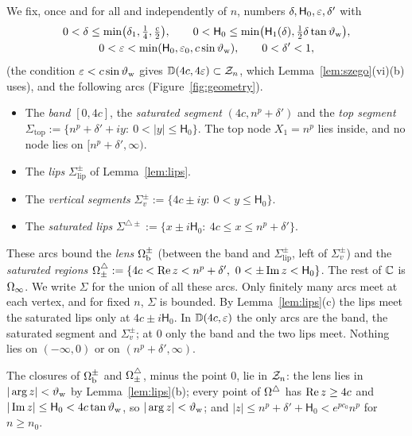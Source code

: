 We fix, once and for all and independently of $n$, numbers $\delta,\mathsf H_0,\varepsilon,\delta'$ with
\begin{gather*}
  0<\delta\le\min\bigl(\delta_1,\tfrac14,\tfrac c2\bigr),\qquad 0<\mathsf H_0\le\min\bigl(\mathsf H_1(\delta),\tfrac12\delta\tan\vartheta_{\mathrm{w}}\bigr),\\
  0<\varepsilon<\min(\mathsf H_0,\varepsilon_0,c\sin\vartheta_{\mathrm{w}}),\qquad 0<\delta'<1,
\end{gather*}
(the condition $\varepsilon<c\sin\vartheta_{\mathrm{w}}$ gives $\mathbb D(4c,4\varepsilon)\subset\mathcal{Z}_n$, which Lemma~\ref{lem:szego}(vi)(b) uses), and the
following arcs (Figure~\ref{fig:geometry}).
\begin{itemize}
\item The \emph{band} $[0,4c]$, the \emph{saturated segment} $(4c,n^p+\delta')$ and the \emph{top segment}
  $\Sigma_{\mathrm{top}}:=\{n^p+\delta'+iy:\ 0<|y|\le \mathsf H_0\}$. The top node $X_1=n^p$ lies inside, and no node lies on
  $[n^p+\delta',\infty)$.
\item The \emph{lips} $\Sigma_{\mathrm{lip}}^\pm$ of Lemma~\ref{lem:lips}.
\item The \emph{vertical segments} $\Sigma_v^\pm:=\{4c\pm iy:\ 0<y\le \mathsf H_0\}$.
\item The \emph{saturated lips} $\Sigma^{\triangle\pm}:=\{x\pm i\mathsf H_0:\ 4c\le x\le n^p+\delta'\}$.
\end{itemize}
These arcs bound the \emph{lens} $\Omega_{\mathrm{b}}^\pm$ (between the band and $\Sigma^\pm_{\mathrm{lip}}$, left of
$\Sigma^\pm_v$) and the \emph{saturated regions} $\Osat_\pm:=\{4c<\re z<n^p+\delta',\ 0<\pm\im z<\mathsf H_0\}$. The rest of
$\mathbb{C}$ is $\Omega_{\infty}$. We write $\Sigma$ for the union of all these arcs. Only finitely many arcs meet at each vertex, and
for fixed $n$, $\Sigma$ is bounded. By Lemma~\ref{lem:lips}(c) the lips meet the saturated lips only at $4c\pm i\mathsf H_0$. In
$\mathbb D(4c,\varepsilon)$ the only arcs are the band, the saturated segment and $\Sigma^\pm_v$; at $0$ only the band and the two lips
meet. Nothing lies on $(-\infty,0)$ or on $(n^p+\delta',\infty)$.

The closures of $\Omega_{\mathrm{b}}^\pm$ and $\Omega^{\triangle}_\pm$, minus the point $0$, lie in $\mathcal{Z}_n$: the lens lies in $|\arg z|<\vartheta_{\mathrm{w}}$ by
Lemma~\ref{lem:lips}(b); every point of $\Omega^{\triangle}$ has $\operatorname{Re} z\ge4c$ and $|\operatorname{Im} z|\le \mathsf H_0<4c\tan\vartheta_{\mathrm{w}}$, so $|\arg z|<\vartheta_{\mathrm{w}}$;
and $|z|\le n^p+\delta'+\mathsf H_0<e^{pc_0}n^p$ for $n\ge n_0$.

